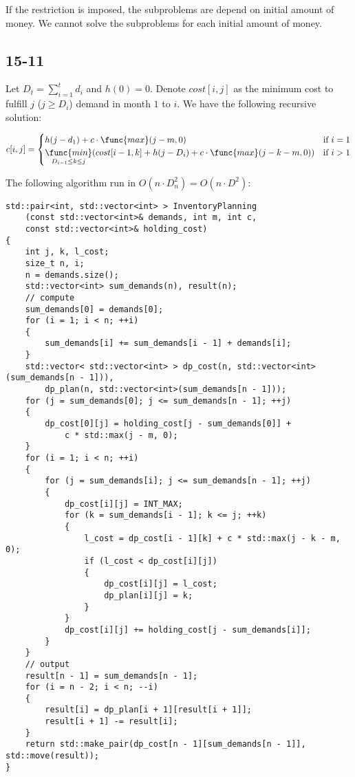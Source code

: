 If the restriction is imposed,
the subproblems are depend on initial amount of money.
We cannot solve the subproblems for each initial amount of money.

\subsection*{15-11}

Let $D_t = \sum\limits_{i = 1}^{t} d_i$
and $h(0) = 0$.
Denote $cost[i, j]$ as the minimum cost to 
fulfill $j$ ($j \geq D_i$) demand in month $1$ to $i$.
We have the following recursive solution:

\begin{equation*}
    c[i,j] = 
    \begin{cases}
        h(j - d_1) + c \cdot \func{max}(j - m, 0) 
            & \text{if } i = 1 \\
        \mathop{\func{min}}\limits_{D_{i-1} \leq k \leq j}
        (cost[i-1,k] + h(j - D_i) + c \cdot \func{max}(j - k - m, 0))
            & \text{if } i > 1
    \end{cases}
\end{equation*}

The following algorithm run in $O(n \cdot D_n^2) = O(n \cdot D^2)$:

\begin{verbatim}
std::pair<int, std::vector<int> > InventoryPlanning
    (const std::vector<int>& demands, int m, int c, 
    const std::vector<int>& holding_cost)
{
    int j, k, l_cost;
    size_t n, i;
    n = demands.size();
    std::vector<int> sum_demands(n), result(n);
    // compute
    sum_demands[0] = demands[0];
    for (i = 1; i < n; ++i)
    {
        sum_demands[i] += sum_demands[i - 1] + demands[i];
    }
    std::vector< std::vector<int> > dp_cost(n, std::vector<int>(sum_demands[n - 1])),
        dp_plan(n, std::vector<int>(sum_demands[n - 1]));
    for (j = sum_demands[0]; j <= sum_demands[n - 1]; ++j)
    {
        dp_cost[0][j] = holding_cost[j - sum_demands[0]] + 
            c * std::max(j - m, 0);
    }
    for (i = 1; i < n; ++i)
    {
        for (j = sum_demands[i]; j <= sum_demands[n - 1]; ++j)
        {
            dp_cost[i][j] = INT_MAX;
            for (k = sum_demands[i - 1]; k <= j; ++k)
            {
                l_cost = dp_cost[i - 1][k] + c * std::max(j - k - m, 0);
                if (l_cost < dp_cost[i][j])
                {
                    dp_cost[i][j] = l_cost;
                    dp_plan[i][j] = k;
                }
            }
            dp_cost[i][j] += holding_cost[j - sum_demands[i]];
        }
    }
    // output
    result[n - 1] = sum_demands[n - 1];
    for (i = n - 2; i < n; --i)
    {
        result[i] = dp_plan[i + 1][result[i + 1]];
        result[i + 1] -= result[i];
    }
    return std::make_pair(dp_cost[n - 1][sum_demands[n - 1]], std::move(result));
}
\end{verbatim}

